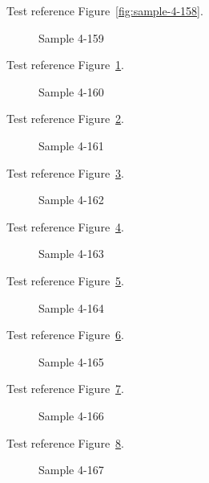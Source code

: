Test reference Figure~\ref{fig:sample-4-158}.

\begin{figure}[tbhp]
\caption{Sample 4-159}
\label{fig:sample-4-159}
\end{figure}

Test reference Figure~\ref{fig:sample-4-159}.

\begin{figure}[tbhp]
\caption{Sample 4-160}
\label{fig:sample-4-160}
\end{figure}

Test reference Figure~\ref{fig:sample-4-160}.

\begin{figure}[tbhp]
\caption{Sample 4-161}
\label{fig:sample-4-161}
\end{figure}

Test reference Figure~\ref{fig:sample-4-161}.

\begin{figure}[tbhp]
\caption{Sample 4-162}
\label{fig:sample-4-162}
\end{figure}

Test reference Figure~\ref{fig:sample-4-162}.

\begin{figure}[tbhp]
\caption{Sample 4-163}
\label{fig:sample-4-163}
\end{figure}

Test reference Figure~\ref{fig:sample-4-163}.

\begin{figure}[tbhp]
\caption{Sample 4-164}
\label{fig:sample-4-164}
\end{figure}

Test reference Figure~\ref{fig:sample-4-164}.

\begin{figure}[tbhp]
\caption{Sample 4-165}
\label{fig:sample-4-165}
\end{figure}

Test reference Figure~\ref{fig:sample-4-165}.

\begin{figure}[tbhp]
\caption{Sample 4-166}
\label{fig:sample-4-166}
\end{figure}

Test reference Figure~\ref{fig:sample-4-166}.

\begin{figure}[tbhp]
\caption{Sample 4-167}
\label{fig:sample-4-167}
\end{figure}

